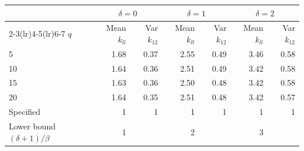\begin{tabular}{lrrrrrr}
\toprule
 & \multicolumn{2}{c}{$\delta=0$} & \multicolumn{2}{c}{$\delta=1$} & \multicolumn{2}{c}{$\delta=2$} \\
\cmidrule(lr){2-3}\cmidrule(lr){4-5}\cmidrule(lr){6-7}
$q$ & Mean $k_{ll}$ & Var $k_{12}$ & Mean $k_{ll}$ & Var $k_{12}$ & Mean $k_{ll}$ & Var $k_{12}$ \\
\midrule
5 & 1.68 & 0.37 & 2.55 & 0.49 & 3.46 & 0.58 \\
10 & 1.64 & 0.36 & 2.51 & 0.49 & 3.42 & 0.58 \\
15 & 1.63 & 0.36 & 2.50 & 0.48 & 3.42 & 0.58 \\
20 & 1.64 & 0.35 & 2.51 & 0.48 & 3.42 & 0.57 \\
\midrule
Specified & 1 & 1 & 1 & 1 & 1 & 1 \\
Lower bound $(\delta+1)/\beta$ & 1 &  & 2 &  & 3 &  \\
\bottomrule
\end{tabular}
